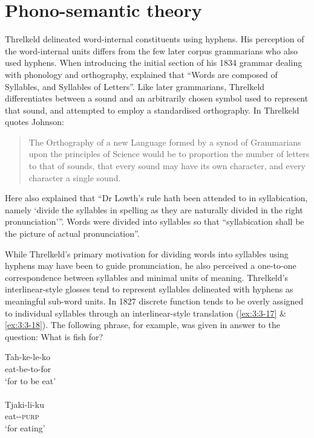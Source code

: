 \section{Phono-semantic theory}
\label{sec:key:3.2.1}

Threlkeld delineated word-internal constituents using hyphens. His perception of the word-internal units differs from the few later corpus grammarians who also used hyphens. When introducing the initial section of his 1834 grammar dealing with phonology and orthography, \citet[1]{threlkeld_australian_1834} explained that “Words are composed of Syllables, and Syllables of Letters”. Like later grammarians, Threlkeld differentiates between a sound and an arbitrarily chosen symbol used to represent that sound, and attempted to employ a standardised orthography. In \citeyear{threlkeld_specimens_1927} Threlkeld quotes Johnson: 

\begin{quote}
    The Orthography of a new Language formed by a synod of Grammarians upon the principles of Science would be to proportion the number of letters to that of sounds, that every sound may have its own character, and every character a single sound. \citep[1]{threlkeld_specimens_1927}
\end{quote}

Here \citet[1]{threlkeld_specimens_1927} also explained that “Dr Lowth’s rule hath been attended to in syllabication, namely `divide the syllables in spelling as they are naturally divided in the right pronunciation'”. Words were divided into syllables so that ``syllabication shall be the picture of actual pronunciation''. 

While Threlkeld’s primary motivation for dividing words into syllables using hyphens may have been to guide pronunciation, he also perceived a one-to-one correspondence between syllables and minimal units of meaning. Threlkeld’s interlinear-style glosses tend to represent syllables delineated with hyphens as meaningful sub-word units. In 1827 discrete function tends to be overly assigned to individual syllables through an interlinear-style translation (\ref{ex:3:3-17} \& \ref{ex:3:3-18}). The following phrase, for example, was given in answer to the question: What is fish for?

\ea\label{ex:3:3-17}
\gll Tah-ke-le-ko \\                                 
eat-be-to-for \\
\glt `for to be eat' \\
\citep[11]{threlkeld_specimens_1927} \\
\gll Tjaki-li-ku \\
eat--\textsc{purp} \\
\glt  `for eating' \\
\z
     
